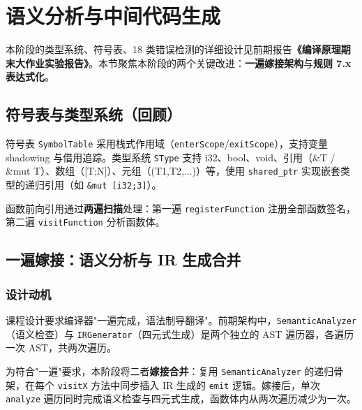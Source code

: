 \documentclass[12pt,a4paper]{ctexart}
\begin{document}
\newpage

\section{语义分析与中间代码生成}

本阶段的类型系统、符号表、18 类错误检测的详细设计见前期报告\textbf{《编译原理期末大作业实验报告》}。本节聚焦本阶段的两个关键改进：\textbf{一遍嫁接架构}与\textbf{规则 7.x 表达式化}。

\subsection{符号表与类型系统（回顾）}

符号表 \texttt{SymbolTable} 采用栈式作用域（\texttt{enterScope}/\texttt{exitScope}），支持变量 shadowing 与借用追踪。类型系统 \texttt{SType} 支持 i32、bool、void、引用（\&T / \&mut T）、数组（[T;N]）、元组（(T1,T2,...)）等，使用 \texttt{shared\_ptr} 实现嵌套类型的递归引用（如 \texttt{\&mut [i32;3]}）。

函数前向引用通过\textbf{两遍扫描}处理：第一遍 \texttt{registerFunction} 注册全部函数签名，第二遍 \texttt{visitFunction} 分析函数体。

\subsection{一遍嫁接：语义分析与 IR 生成合并}

\subsubsection{设计动机}

课程设计要求编译器"一遍完成，语法制导翻译"。前期架构中，\texttt{SemanticAnalyzer}（语义检查）与 \texttt{IRGenerator}（四元式生成）是两个独立的 AST 遍历器，各遍历一次 AST，共两次遍历。

为符合"一遍"要求，本阶段将二者\textbf{嫁接合并}：复用 \texttt{SemanticAnalyzer} 的递归骨架，在每个 \texttt{visitX} 方法中同步插入 IR 生成的 \texttt{emit} 逻辑。嫁接后，单次 \texttt{analyze} 遍历同时完成语义检查与四元式生成，函数体内从两次遍历减少为一次。
\end{document}
